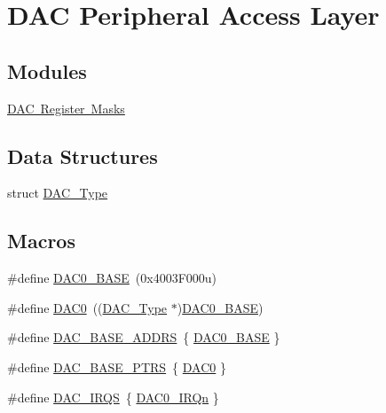 \hypertarget{group___d_a_c___peripheral___access___layer}{}\section{D\+AC Peripheral Access Layer}
\label{group___d_a_c___peripheral___access___layer}
\subsection*{Modules}
\begin{DoxyCompactItemize}
\item 
\mbox{\hyperlink{group___d_a_c___register___masks}{D\+A\+C Register Masks}}
\end{DoxyCompactItemize}
\subsection*{Data Structures}
\begin{DoxyCompactItemize}
\item 
struct \mbox{\hyperlink{struct_d_a_c___type}{D\+A\+C\+\_\+\+Type}}
\end{DoxyCompactItemize}
\subsection*{Macros}
\begin{DoxyCompactItemize}
\item 
\#define \mbox{\hyperlink{group___d_a_c___peripheral___access___layer_gada12ca8452e773fd8f38041872934efc}{D\+A\+C0\+\_\+\+B\+A\+SE}}~(0x4003\+F000u)
\item 
\#define \mbox{\hyperlink{group___d_a_c___peripheral___access___layer_gadfe0025fe66918c644e110c3b055c955}{D\+A\+C0}}~((\mbox{\hyperlink{struct_d_a_c___type}{D\+A\+C\+\_\+\+Type}} $\ast$)\mbox{\hyperlink{group___d_a_c___peripheral___access___layer_gada12ca8452e773fd8f38041872934efc}{D\+A\+C0\+\_\+\+B\+A\+SE}})
\item 
\#define \mbox{\hyperlink{group___d_a_c___peripheral___access___layer_ga2e056d497cd21aa7a51e188e005e9b37}{D\+A\+C\+\_\+\+B\+A\+S\+E\+\_\+\+A\+D\+D\+RS}}~\{ \mbox{\hyperlink{group___d_a_c___peripheral___access___layer_gada12ca8452e773fd8f38041872934efc}{D\+A\+C0\+\_\+\+B\+A\+SE}} \}
\item 
\#define \mbox{\hyperlink{group___d_a_c___peripheral___access___layer_gab47690040e4d63adc4f324358c27157a}{D\+A\+C\+\_\+\+B\+A\+S\+E\+\_\+\+P\+T\+RS}}~\{ \mbox{\hyperlink{group___d_a_c___peripheral___access___layer_gadfe0025fe66918c644e110c3b055c955}{D\+A\+C0}} \}
\item 
\#define \mbox{\hyperlink{group___d_a_c___peripheral___access___layer_gac003cc87c636841f96fbf9084f536c43}{D\+A\+C\+\_\+\+I\+R\+QS}}~\{ \mbox{\hyperlink{group___interrupt__vector__numbers_gga666eb0caeb12ec0e281415592ae89083a6029e7bffa10f584e060a5448a456927}{D\+A\+C0\+\_\+\+I\+R\+Qn}} \}
\end{DoxyCompactItemize}



